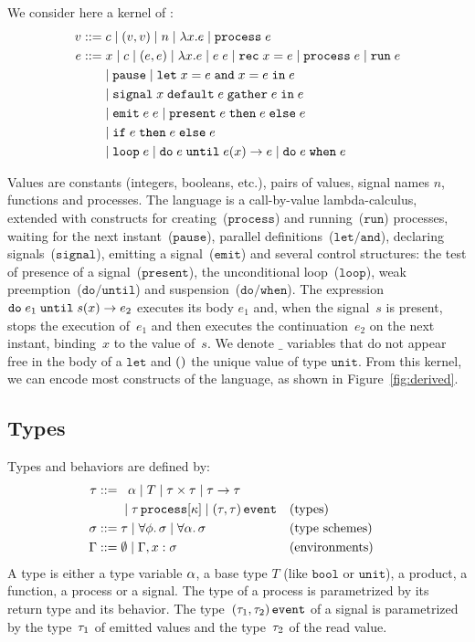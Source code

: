 \documentclass[9pt]{sigplanconf}
\newcommand{\sdeq}{::=}
\begin{document}
We consider here a kernel of \rml{}:
%
\begin{align*}
v \sdeq &\; c \mid (v, v) \mid n \mid \elam{x}{e} \mid \eproc{e} \\
e \sdeq &\;  x \mid c \mid (e, e) \mid \elam{x}{e} 
  \mid \eapp{e}{e} \mid \erec{x}{e}  \mid \eproc{e} \mid \erun{e} \\
 & \mid \epause{} \mid \eletpar{x}{e}{x}{e}{e} \\
 &\mid \esig{x}{e}{e}{e} \\
 & \mid \eemit{e}{e} \mid \epres{e}{e}{e} \\
 & \mid \eite{e}{e}{e} \\
 &  \mid \eloop{e} \mid \euntil{e}{e}{x}{e} 
   \mid \ewhen{e}{e} 
\end{align*}

Values are constants (integers, booleans, etc.), pairs of values, signal names $n$, functions and processes. The language is a call-by-value lambda-calculus, extended with constructs for creating~($\mathtt{process}$) and running~($\mathtt{run}$) processes, waiting for the next instant~($\mathtt{pause}$), parallel definitions~($\mathtt{let/and}$), declaring signals~($\mathtt{signal}$), emitting a signal~($\mathtt{emit}$) and several control structures: the test of presence of a signal~($\mathtt{present}$), the unconditional loop~($\mathtt{loop}$), weak preemption~($\mathtt{do/until}$) and suspension~($\mathtt{do/when}$).  The expression $\mathtt{do}\; e_1 \;\mathtt{until}\; s(x) \rightarrow e_2$ executes its body $e_1$ and, when the signal~$s$ is present, stops the execution of~$e_1$ and then executes the continuation~$e_2$ on the next instant, binding~$x$ to the value of~$s$. We denote $\_$ variables that do not appear free in the body of a $\mathtt{let}$ and $\mathtt{()}{}$ the unique value of type $\mathtt{unit}$. From this kernel, we can encode most constructs of the language, as shown in Figure~\ref{fig:derived}.

\subsection{Types}

Types and behaviors are defined by:
\begin{align*}
\rt \sdeq &\;\;\; \rtvar \mid T \mid \rtprod{\rt}{\rt} \mid \rtarrow{\rt}{\rt} \\
    &\;\mid \rtproc{\rt}{\rk} \mid \rtsig{\rt}{\rt} && \text{(types)} \\
\rs \sdeq &\; \rt \mid \forall \effvar.\, \rs \mid \forall \rtvar.\, \rs && \text{(type schemes)} \\
\tyenv \sdeq&\; \emptyset \mid \tyenv \tyconcat x : \rs && \text{(environments)}
\end{align*}
A type is either a type variable $\alpha$, a base type $T$ (like $\mathtt{bool}$ or $\mathtt{unit}$), a product, a function, a process or a signal. The type of a process is parametrized by its return type and its behavior. The type~$(\tau_1, \tau_2) \,\mathtt{event}$ of a signal is parametrized by the type~$\tau_1$ of emitted values and the type~$\tau_2$ of the read value.
\end{document}
